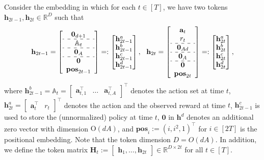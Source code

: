 \documentclass[10pt]{article}
\newcommand{\<}{\left\langle}
\renewcommand{\>}{\right\rangle}
\newcommand{\bzero}{{\mathbf 0}}
\newcommand{\R}{\mathbb{R}}
\newcommand{\posv}{{\mathbf{pos}}}
\newcommand{\parta}{{a}}
\newcommand{\partb}{{b}}
\newcommand{\partc}{{c}}
\newcommand{\partd}{{d}}
\newcommand{\totlen}{{T}} %
\newcommand{\cat}{{\tt cat}}
\newcommand{\extractmap}{{\tt A}}
\newcommand{\embedmap}{{\tt h}}
\newcommand{\conO}{{\mathrm{O}}}
\def\sA{{\mathbb{A}}}
\def\bH{{\mathbf H}}
\def\ba{{\mathbf a}}
\def\bh{{\mathbf h}}
\begin{document}
Consider the embedding in which for each $t\in[\totlen]$, we have two tokens $\bh_{2t-1},\bh_{2t}\in\R^D$ such that
\[
\begin{aligned}
\bh_{2t-1}=
\left[
\begin{array}{c}
     \bzero_{d+1} \\
     \hdashline
     \sA_t\\  
     \hdashline
     \bzero_A\\  
     \hdashline
      \bzero\\ \posv_{2t-1}
\end{array}
\right]
=:
\begin{bmatrix}
     \bh_{2t-1}^{\parta} \\  \bh_{2t-1}^{\partb}\\  \bh_{2t-1}^{\partc}\\   \bh_{2t-1}^{\partd}\\
\end{bmatrix},~~
\bh_{2t}=
\left[
\begin{array}{cc}
     \ba_{t} \\
      r_t\\  
      \hdashline
       \bzero_{Ad}\\ 
       \hdashline 
       \bzero_{A}\\ 
       \hdashline  
       \bzero\\ \posv_{2t}
\end{array}
\right]=:
\begin{bmatrix}
    \bh_{2t}^{\parta} \\  \bh_{2t}^{\partb}\\   \bh_{2t}^{\partc}\\   \bh_{2t}^{\partd}
\end{bmatrix},
\end{aligned}
\]
where $\bh_{2t-1}^{\partb}=\sA_t=\begin{bmatrix}
    \ba_{t,1}^\top &\ldots & \ba_{t,A}^\top
\end{bmatrix}^\top$ denotes the action set at time $t$, $\bh_{2t}^{\parta}=\begin{bmatrix}
    \ba_t^\top &r_t
\end{bmatrix}^\top$ denotes the action and the observed reward at time $t$, $\bh^\partc_{2t-1}$ is used to store the (unnormalized) policy at time  $t$, $\bzero$ in $\bh^\partd$ denotes an additional zero vector with  dimension $\conO(dA)$, and $\posv_i:=(i,i^2,1)^\top$ for $i\in[2\totlen]$ is the positional embedding.    Note that the token dimension $D= O(dA)$. In addition, we define the token matrix $\bH_t:=\begin{bmatrix}
    \bh_1,\ldots,\bh_{2t}
\end{bmatrix}\in\R^{D\times 2t}$ for all $t\in[\totlen]$.
\end{document}
